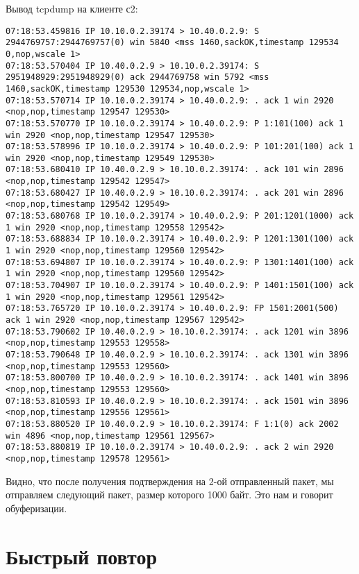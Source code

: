 \documentclass[a4paper,12pt]{article}
\begin{document}
Вывод tcpdump на клиенте с2:
\begin{Verbatim}
07:18:53.459816 IP 10.10.0.2.39174 > 10.40.0.2.9: S 2944769757:2944769757(0) win 5840 <mss 1460,sackOK,timestamp 129534 0,nop,wscale 1>
07:18:53.570404 IP 10.40.0.2.9 > 10.10.0.2.39174: S 2951948929:2951948929(0) ack 2944769758 win 5792 <mss 1460,sackOK,timestamp 129530 129534,nop,wscale 1>
07:18:53.570714 IP 10.10.0.2.39174 > 10.40.0.2.9: . ack 1 win 2920 <nop,nop,timestamp 129547 129530>
07:18:53.570770 IP 10.10.0.2.39174 > 10.40.0.2.9: P 1:101(100) ack 1 win 2920 <nop,nop,timestamp 129547 129530>
07:18:53.578996 IP 10.10.0.2.39174 > 10.40.0.2.9: P 101:201(100) ack 1 win 2920 <nop,nop,timestamp 129549 129530>
07:18:53.680410 IP 10.40.0.2.9 > 10.10.0.2.39174: . ack 101 win 2896 <nop,nop,timestamp 129542 129547>
07:18:53.680427 IP 10.40.0.2.9 > 10.10.0.2.39174: . ack 201 win 2896 <nop,nop,timestamp 129542 129549>
07:18:53.680768 IP 10.10.0.2.39174 > 10.40.0.2.9: P 201:1201(1000) ack 1 win 2920 <nop,nop,timestamp 129558 129542>
07:18:53.688834 IP 10.10.0.2.39174 > 10.40.0.2.9: P 1201:1301(100) ack 1 win 2920 <nop,nop,timestamp 129560 129542>
07:18:53.694807 IP 10.10.0.2.39174 > 10.40.0.2.9: P 1301:1401(100) ack 1 win 2920 <nop,nop,timestamp 129560 129542>
07:18:53.704907 IP 10.10.0.2.39174 > 10.40.0.2.9: P 1401:1501(100) ack 1 win 2920 <nop,nop,timestamp 129561 129542>
07:18:53.765720 IP 10.10.0.2.39174 > 10.40.0.2.9: FP 1501:2001(500) ack 1 win 2920 <nop,nop,timestamp 129567 129542>
07:18:53.790602 IP 10.40.0.2.9 > 10.10.0.2.39174: . ack 1201 win 3896 <nop,nop,timestamp 129553 129558>
07:18:53.790648 IP 10.40.0.2.9 > 10.10.0.2.39174: . ack 1301 win 3896 <nop,nop,timestamp 129553 129560>
07:18:53.800700 IP 10.40.0.2.9 > 10.10.0.2.39174: . ack 1401 win 3896 <nop,nop,timestamp 129553 129560>
07:18:53.810593 IP 10.40.0.2.9 > 10.10.0.2.39174: . ack 1501 win 3896 <nop,nop,timestamp 129556 129561>
07:18:53.880520 IP 10.40.0.2.9 > 10.10.0.2.39174: F 1:1(0) ack 2002 win 4896 <nop,nop,timestamp 129561 129567>
07:18:53.880819 IP 10.10.0.2.39174 > 10.40.0.2.9: . ack 2 win 2920 <nop,nop,timestamp 129578 129561>
\end{Verbatim}

Видно, что после получения подтверждения на 2-ой отправленный пакет, мы отправляем
следующий пакет, размер которого 1000 байт. Это нам и говорит обуферизации.

\section{Быстрый повтор}
\end{document}
